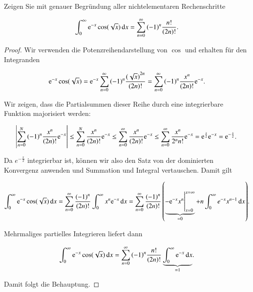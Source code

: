 
\begin{exercise}
  Zeigen Sie mit genauer Begründung aller nichtelementaren Rechenschritte

  \begin{equation*}
    \int_0^\infty{\e^{-x}\cos(\sqrt{x})\dif x}=\sum_{n=0}^\infty{{(-1)}^n \frac{n!}{(2n)!}}.
  \end{equation*}
\end{exercise}
\begin{proof}
  Wir verwenden die Potenzreihendarstellung von $\cos$ und erhalten für den Integranden

  \begin{equation*}
    \mathrm{e}^{-x}\cos(\sqrt{x})
    = \mathrm{e}^{-x}\sum_{n=0}^\infty{(-1)}^n\frac{{(\sqrt{x})}^{2n}}{(2n)!}
    = \sum_{n=0}^\infty{{(-1)}^n\frac{x^n}{(2n)!}\mathrm{e}^{-x}}.
  \end{equation*}

  Wir zeigen, dass die Partialsummen dieser Reihe durch eine integrierbare Funktion majorisiert werden:

  \begin{equation*}
    \abs{\sum_{n=0}^N{{(-1)}^n\frac{x^n}{(2n)!}\mathrm{e}^{-x}}}
    \leq \sum_{n=0}^N{\frac{x^n}{(2n)!}\mathrm{e}^{-x}}
    \leq \sum_{n=0}^\infty{\frac{x^n}{(2n)!}\mathrm{e}^{-x}}
    \leq \sum_{n=0}^\infty{\frac{x^n}{2^n n!}\mathrm{e}^{-x}}
    = \mathrm{e}^{\frac{x}{2}} \mathrm{e}^{-x}=\mathrm{e}^{-\frac{x}{2}}.
  \end{equation*}

  Da $e^{-\frac{x}{2}}$ integrierbar ist, können wir also den Satz von der dominierten Konvergenz anwenden und Summation und Integral vertauschen. Damit gilt

  \begin{equation*}
    \int_0^\infty{\e^{-x}\cos(\sqrt{x})\dif x}
    = \sum_{n=0}^\infty{\frac{{(-1)}^n}{(2n)!}\int_0^\infty{x^n\e^{-x} \dif x}}
    = \sum_{n=0}^\infty{\frac{{(-1)}^n}{(2n)!}\left(\underbrace{\eval{-\e^{-x} x^n}_{x=0}^{x=\infty}}_{=0} + n \int_0^\infty{e^{-x}x^{n-1} \dif x}\right)}.
  \end{equation*}

  Mehrmaliges partielles Integrieren liefert dann

  \begin{equation*}
    \int_0^\infty{\e^{-x}\cos(\sqrt{x})\dif x}
    = \sum_{n=0}^\infty{{(-1)}^n\frac{n!}{(2n)!} \underbrace{\int_0^\infty{\e^{-x} \dif x}}_{=1}}.
  \end{equation*}

  Damit folgt die Behauptung.
\end{proof}
